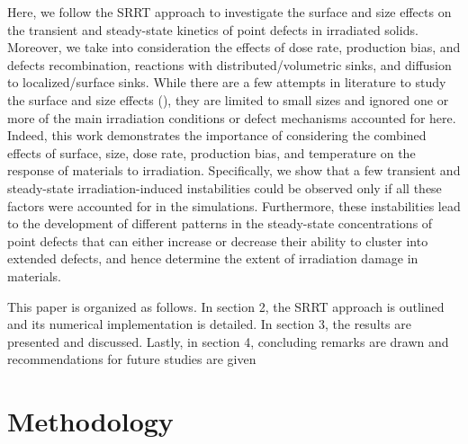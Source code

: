 \documentclass[utf8]{frontiersSCNS} %
\begin{document}
Here, we follow the SRRT approach to investigate the surface and size effects on the transient and steady-state kinetics of point defects in irradiated solids. Moreover, we take into consideration the effects of dose rate, production bias, and defects recombination, reactions with distributed/volumetric sinks, and diffusion to localized/surface sinks. While there are a few attempts in literature to study the surface and size effects (\citep{yang2010,demkowicz2011,xu2012}), they are limited to small sizes and ignored one or more of the main irradiation conditions or defect mechanisms accounted for here. Indeed, this work demonstrates the importance of considering the combined effects of surface, size, dose rate, production bias, and temperature on the response of materials to irradiation. Specifically, we show that a few transient and steady-state irradiation-induced instabilities could be observed only if all these factors were accounted for in the simulations. Furthermore, these instabilities lead to the development of different patterns in the steady-state concentrations of point defects that can either increase or decrease their ability to cluster into extended defects, and hence determine the extent of irradiation damage in materials.

This paper is organized as follows. In section 2, the SRRT approach is outlined and its numerical implementation is detailed. In section 3, the results are presented and discussed. Lastly, in section 4, concluding remarks are drawn and recommendations for future studies are given


\newpage
\section{Methodology}

\end{document}
